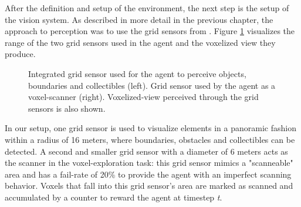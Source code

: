After the definition and setup of the environment, the next step is the setup of the vision system. As described in more detail in the previous chapter, the approach to perception was to use the grid sensors from \cite{github-unity-mlagents-toolkit, github-mbaske-gridsensor}. 
Figure \ref{fig:unity-island-gridsensors} visualizes the range of the two grid sensors used in the agent and the voxelized view they produce. 

\begin{figure}[!h]
    \centering
    \caption{Integrated grid sensor used for the agent to perceive objects, boundaries and collectibles (left). Grid sensor used by the agent as a voxel-scanner (right). Voxelized-view perceived through the grid sensors is also shown.}
    \label{fig:unity-island-gridsensors}
\end{figure}

In our setup, one grid sensor is used to visualize elements in a panoramic fashion within a radius of 16 meters, where boundaries, obstacles and collectibles can be detected.
A second and smaller grid sensor with a diameter of 6 meters acts as the scanner in the voxel-exploration task: this grid sensor mimics a "scanneable" area and has a fail-rate of 20\% to provide the agent with an imperfect scanning behavior. Voxels that fall into this grid sensor's area are marked as scanned and accumulated by a counter to reward the agent at timestep \textit{t}. 

